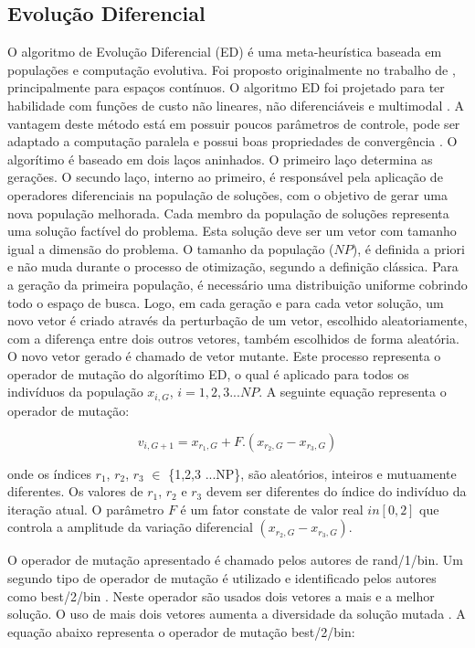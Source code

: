 \documentclass[12pt,A4,A4pt]{article}
\begin{document}
\subsection{Evolução Diferencial}
\label{ed}
\hspace{0.5cm}O algoritmo de Evolução Diferencial (ED) é uma meta-heurística baseada em populações e computação evolutiva. Foi proposto originalmente no trabalho de , principalmente para espaços contínuos. O algoritmo ED foi projetado para ter habilidade com funções de custo não lineares, não diferenciáveis e multimodal \cite{Storn1997}. A vantagem deste método está em possuir poucos parâmetros de controle, pode ser adaptado a computação paralela e possui boas propriedades de convergência \cite{Storn1997}. O algorítimo é baseado em dois laços aninhados. O primeiro laço determina as gerações. O secundo laço, interno ao primeiro, é responsável pela aplicação de operadores diferenciais na população de soluções, com o objetivo de gerar uma nova população melhorada. Cada membro da população de soluções representa uma solução factível do problema. Esta solução deve ser um vetor com tamanho igual a dimensão do problema. O tamanho da população ($NP$), é definida a priori e não muda durante o processo de otimização, segundo a definição clássica. Para a geração da primeira população, é necessário uma distribuição uniforme cobrindo todo o espaço de busca. Logo, em cada geração e para cada vetor solução, um novo vetor é criado através da perturbação de um vetor, escolhido aleatoriamente, com a diferença entre dois outros vetores, também escolhidos de forma aleatória. O novo vetor gerado é chamado de vetor mutante. Este processo representa o operador de mutação do algorítimo ED, o qual é aplicado para todos os indivíduos da população $x_{i,G}$, $i = 1,2,3...NP$. A seguinte equação representa o operador de mutação:

\begin{equation}
v_{i,G+1} = x_{r_{1},G} + F . (x_{r_{2},G} - x_{r_{3},G}) \label{trial}
\end{equation}

onde os índices $r_{1}$, $r_{2}$, $r_{3}$ $\in$ \{1,2,3 ...NP\}, são aleatórios, inteiros e mutuamente diferentes. Os valores de $r_{1}$, $r_{2}$ e $r_{3}$ devem ser diferentes do índice do indivíduo da iteração atual. O parâmetro $F$ é um fator constate de valor real $in [0,2]$ que controla a amplitude da variação diferencial $(x_{r_{2},G} - x_{r_{3},G})$.

O operador de mutação apresentado é chamado pelos autores de rand/1/bin. Um segundo tipo de operador de mutação é utilizado e identificado pelos autores como best/2/bin \cite{Storn1997}. Neste operador são usados dois vetores a mais e a melhor solução. O uso de mais dois vetores aumenta a diversidade da solução mutada \cite{Storn1997}. A equação abaixo representa o operador de mutação best/2/bin:
\end{document}
